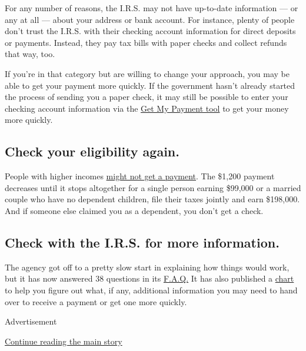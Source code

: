 For any number of reasons, the I.R.S. may not have up-to-date
information --- or any at all --- about your address or bank account.
For instance, plenty of people don't trust the I.R.S. with their
checking account information for direct deposits or payments. Instead,
they pay tax bills with paper checks and collect refunds that way, too.

If you're in that category but are willing to change your approach, you
may be able to get your payment more quickly. If the government hasn't
already started the process of sending you a paper check, it may still
be possible to enter your checking account information via the
\href{https://www.irs.gov/coronavirus/get-my-payment}{Get My Payment
tool} to get your money more quickly.

\hypertarget{check-your-eligibility-again}{%
\subsection{Check your eligibility
again.}\label{check-your-eligibility-again}}

People with higher incomes
\href{https://www.irs.gov/coronavirus/economic-impact-payment-information-center\#eligibility}{might
not get a payment}. The \$1,200 payment decreases until it stops
altogether for a single person earning \$99,000 or a married couple who
have no dependent children, file their taxes jointly and earn \$198,000.
And if someone else claimed you as a dependent, you don't get a check.

\hypertarget{check-with-the-irs-for-more-information}{%
\subsection{Check with the I.R.S. for more
information.}\label{check-with-the-irs-for-more-information}}

The agency got off to a pretty slow start in explaining how things would
work, but it has now answered 38 questions in its
\href{https://www.irs.gov/coronavirus/economic-impact-payment-information-center}{F.A.Q.}
It has also published a
\href{https://www.irs.gov/newsroom/how-to-use-the-tools-on-irsgov-to-get-your-economic-impact-payment}{chart}
to help you figure out what, if any, additional information you may need
to hand over to receive a payment or get one more quickly.

Advertisement

\protect\hyperlink{after-bottom}{Continue reading the main story}

